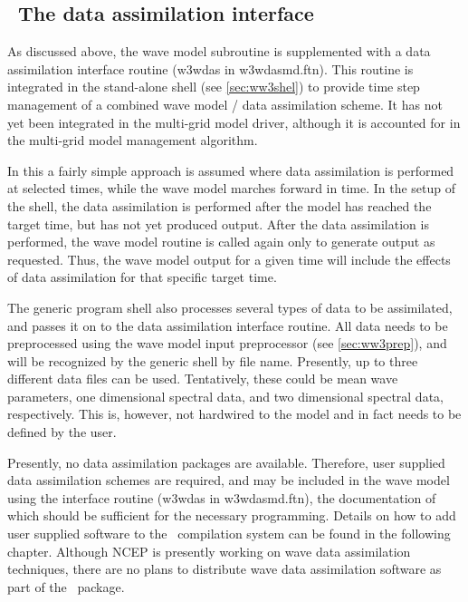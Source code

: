 \vssub
\subsection{~The data assimilation interface} \label{sec:das}
\vssub

As discussed above, the wave model subroutine is supplemented with a data
assimilation interface routine ({\F w3wdas} in {\file w3wdasmd.ftn}). This
routine is integrated in the stand-alone shell (see \para\ref{sec:ww3shel}) to
provide time step management of a combined wave model / data assimilation
scheme. It has not yet been integrated in the multi-grid model driver,
although it is accounted for in the multi-grid model management
algorithm. 

In this a fairly simple approach is assumed where data assimilation
is performed at selected times, while the wave model marches forward in
time. In the setup of the shell, the data assimilation is performed after the
model has reached the target time, but has not yet produced output. After the
data assimilation is performed, the wave model routine is called again only to
generate output as requested. Thus, the wave model output for a given time
will include the effects of data assimilation for that specific target time.

The generic program shell also processes several types of data to be
assimilated, and passes it on to the data assimilation interface routine. All
data needs to be preprocessed using the wave model input preprocessor (see
\para\ref{sec:ww3prep}), and will be recognized by the generic shell by file
name. Presently, up to three different data files can be used. Tentatively,
these could be mean wave parameters, one dimensional spectral data, and two
dimensional spectral data, respectively. This is, however, not hardwired to
the model and in fact needs to be defined by the user.

Presently, no data assimilation packages are available. Therefore, user supplied 
data assimilation schemes are required, and may be included in the wave model 
using the interface routine ({\F w3wdas} in {\file w3wdasmd.ftn}), the documentation 
of which should be sufficient for the necessary programming. Details on how to add 
user supplied software to the \ws\ compilation system can be found in the following
chapter. Although NCEP is presently working on wave data assimilation techniques, 
 there are no plans to distribute wave data assimilation software as part of the 
\ws\ package.
